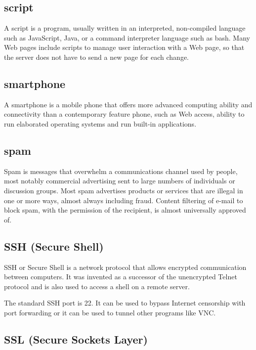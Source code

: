 \subsection{script}

A script is a program, usually written in an interpreted, non-compiled
language such as JavaScript, Java, or a command interpreter language
such as bash. Many Web pages include scripts to manage user interaction
with a Web page, so that the server does not have to send a new page for
each change.

\subsection{smartphone}

A smartphone is a mobile phone that offers more advanced computing
ability and connectivity than a contemporary feature phone, such as Web
access, ability to run elaborated operating systems and run built-in
applications.

\subsection{spam}

Spam is messages that overwhelm a communications channel used by people,
most notably commercial advertising sent to large numbers of individuals
or discussion groups. Most spam advertises products or services that are
illegal in one or more ways, almost always including fraud. Content
filtering of e-mail to block spam, with the permission of the recipient,
is almost universally approved of.

\subsection{SSH (Secure Shell)}

SSH or Secure Shell is a network protocol that allows encrypted
communication between computers. It was invented as a successor of the
unencrypted Telnet protocol and is also used to access a shell on a
remote server.

The standard SSH port is 22. It can be used to bypass Internet
censorship with port forwarding or it can be used to tunnel other
programs like VNC.

\subsection{SSL (Secure Sockets Layer)}

